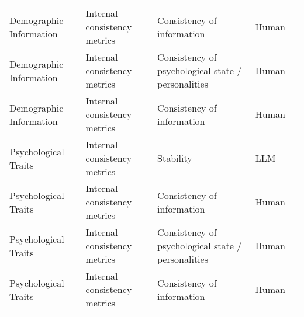 \begin{small}
\begin{center}
\begin{longtable}{@{}p{}p{}p{}p{}p{}@{}}
Demographic Information & Internal consistency metrics        & Consistency of information                                                                                                                  & Human             & \cite{10.1145/3613904.3642363}                                                                                                                  \\
Demographic Information & Internal consistency metrics        & Consistency of psychological state / personalities                                                                                          & Human             & \cite{10.1145/3613904.3642363}                                                                                                                  \\
Demographic Information & Internal consistency metrics        & Consistency of information                                                                                                                  & Human             & \cite{zeng2024persllm}                                                                                                                          \\
Psychological Traits    & Internal consistency metrics        & Stability                                                                                                                                   & LLM               & \cite{shao2023character}                                                                                                                  \\
Psychological Traits    & Internal consistency metrics        & Consistency of information                                                                                                                  & Human             & \cite{zeng2024persllm}                                                                                                                              \\
Psychological Traits    & Internal consistency metrics        & Consistency of psychological state / personalities                                                                                          & Human             & \cite{zeng2024persllm}                                                                                                                              \\
Psychological Traits    & Internal consistency metrics        & Consistency of information                                                                                                                  & Human             & \cite{cai2024digital} \\

\end{longtable}
\end{center}
\end{small}
